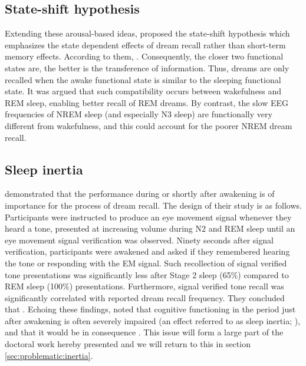 \subsection{State-shift hypothesis}
\label{sec:dream-recall:theories:state}

Extending these arousal-based ideas, \citet{koukkou_dreaming:_1983} proposed the state-shift hypothesis which emphasizes the state dependent effects of dream recall rather than short-term memory effects. According to them,  \citep{koukkou_dreaming:_1983}. Consequently, the closer two functional states are, the better is the transference of information. Thus, dreams are only recalled when the awake functional state
is similar to the sleeping functional state. It was argued that such compatibility occurs between wakefulness and REM sleep, enabling better recall of REM dreams. By contrast, the slow EEG frequencies of NREM sleep (and especially N3 sleep) are functionally very different from wakefulness, and this could account for the poorer NREM dream recall.

\subsection{Sleep inertia}
\label{sec:dream-recall:theories:inertia}

\citet{conduit_poor_2004} demonstrated that the performance during or shortly after awakening is of importance for the process of dream recall. The design of their study is as follows. Participants were instructed to produce an eye movement signal whenever they heard a tone, presented at increasing volume during N2 and REM sleep until an eye movement signal verification was observed.  Ninety seconds after signal verification, participants were awakened and asked if they remembered hearing the tone or responding with the EM signal. Such recollection of signal verified tone presentations was significantly less after Stage 2 sleep (65\%) compared to REM sleep (100\%) presentations. Furthermore, signal verified tone recall was significantly correlated with reported dream recall frequency. They concluded that  \citep{conduit_poor_2004}.
Echoing these findings, \citet{schredl_factors_2003} noted that cognitive functioning in the period just after awakening is often severely impaired (an effect referred to as sleep inertia; \citealp{tassi_sleep_2000, trotti_waking_2016}), and that it would be in consequence . This issue will form a large part of the doctoral work hereby presented and we will return to this in section \ref{sec:problematic:inertia}.

